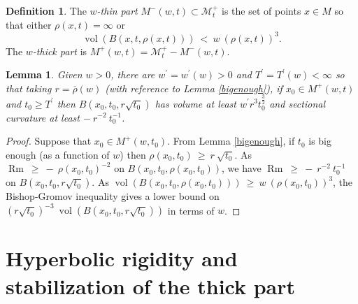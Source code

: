 \documentclass[12pt]{amsart}
\newcommand{\M}{{\mathcal M}}
\newcommand{\Rm}{\operatorname{Rm}}
\newcommand{\vol}{\operatorname{vol}}
\numberwithin{equation}{section}
\theoremstyle{plain}
\newtheorem{lemma}[equation]{Lemma}
\theoremstyle{definition}
\newtheorem{definition}[equation]{Definition}
\theoremstyle{remark}
\begin{document}
\begin{definition}
The {\em $w$-thin part} $M^-(w, t) \subset \M_t^+$ is the set of points
$x \in M$ so that either $\rho(x,t)=\infty$ or
\begin{equation}
\vol(B(x, t, \rho(x, t))) \: < \: w \:
(\rho(x, t))^3.
\end{equation}
The {\em $w$-thick part} is $M^+(w, t) = \M_t^+  - M^-(w, t)$.
\end{definition}

\begin{lemma} \label{applies}
Given $w > 0$, there are
$w^\prime = w^\prime(w) > 0$ and $T^\prime = T^\prime(w) < \infty$ so that
taking $r = \overline{\rho}(w)$
(with reference to Lemma \ref{bigenough}),
if $x_0 \in M^+(w,t)$ and $t_0 \ge T^\prime$ then
$B(x_0, t_0, r\sqrt{t_0})$ has volume at least $w^\prime r^3 t_0^{\frac32}$ and
sectional curvature at least $- \: r^{-2} \: t_0^{-1}$.
\end{lemma}
\begin{proof}
Suppose that $x_0 \in M^+(w, t_0)$. From Lemma \ref{bigenough},
if $t_0$ is big enough (as a function of $w$) then $\rho(x_0, t_0)
\: \ge \: r \: \sqrt{t_0}$.  As $\Rm \: \ge \: 
- \: \rho(x_0, t_0)^{-2}$ on $B(x_0, t_0, \rho(x_0, t_0))$, we have
$\Rm \: \ge \: 
- \: r^{-2} \: t_0^{-1}$ on $B(x_0, t_0, r \sqrt{t_0})$.
As $\vol(B(x_0, t_0, \rho(x_0, t_0))) \: \ge \: w \:
(\rho(x_0, t_0))^3$, the Bishop-Gromov inequality gives a
lower bound on $\left( r \sqrt{t_0} \right)^{-3} \:
\vol(B(x_0, t_0, r \sqrt{t_0}))$ in terms of $w$.
\end{proof}

\section{Hyperbolic rigidity and stabilization of the thick part} 
\label{hyprig}
\end{document}
